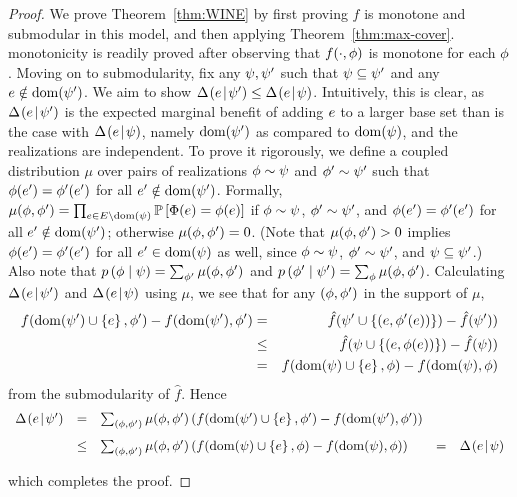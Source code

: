 \begin{proof}
We prove Theorem~\ref{thm:WINE} by first proving $f$ is \term monotone
and \term submodular in
this model, and then applying Theorem~\ref{thm:max-cover}.
\Term monotonicity is readily proved after observing that 
$f(\cdot, \rlz)$ is monotone for each $\rlz$. 
Moving on to \term submodularity, fix any $\prlz, \prlz'$ such that 
$\prlz \subseteq \prlz'$ and any $\elem \notin \dom(\prlz')$.
We aim to show $\diff{\prlz'}{\elem} \le \diff{\prlz}{\elem}$.
Intuitively, this is clear, as $\diff{\prlz'}{\elem}$ is the expected marginal
benefit of adding $\elem$ to a larger base set than
is the case with $\diff{\prlz}{\elem}$, namely  $\dom(\prlz')$ as
compared to $\dom(\prlz)$, and the realizations are independent.
To prove it rigorously, 
we define a coupled distribution $\mu$ over pairs of realizations $\rlz \sim
\prlz$ and $\rlz' \sim \prlz'$ such that 
$\rlz(e') = \rlz'(e')$ for all $e' \notin \dom(\prlz')$.
Formally, 
$\mu(\rlz, \rlz') = \prod_{e \in \groundset \setminus
  \dom(\prlz)}\Pr{\rvrlz(e) = \rlz(e)}$
%
if  $\rlz \sim \prlz$, $\rlz' \sim \prlz'$, and $\rlz(e') =
\rlz'(e')$ for all $e' \notin \dom(\prlz')$; 
otherwise $\mu(\rlz, \rlz') = 0$.  
(Note that $\mu(\rlz, \rlz') > 0$ implies $\rlz(e') = \rlz'(e')$ for all $e' \in \dom(\prlz)$ as well,
since $\rlz \sim \prlz$, $\rlz' \sim \prlz'$, and  $\prlz \subseteq \prlz'$.)
Also note that $\rlzmass{\rlz \mid \prlz} = \sum_{\rlz'} \mu(\rlz, \rlz')$ and $\rlzmass{\rlz' \mid \prlz'} = \sum_{\rlz} \mu(\rlz, \rlz')$. 
Calculating 
$\diff{\prlz'}{\elem}$ and $\diff{\prlz}{\elem}$ using $\mu$, we see 
that for any $(\rlz, \rlz')$ in the support of $\mu$, 
\begin{eqnarray*}
  \label{eq:1mc}
f(\dom(\prlz') \cup \set{e}, \rlz') - f(\dom(\prlz'),
  \rlz')  & = & \hat{f}(\prlz' \cup \set{(\elem,\rlz'(\elem))}) -
  \hat{f}(\prlz'))\\
 & \le & \hat{f}(\prlz \cup \set{(\elem,\rlz(\elem))}) -
  \hat{f}(\prlz)) \\
 & = & f(\dom(\prlz) \cup \set{e}, \rlz) - f(\dom(\prlz),
  \rlz)
\end{eqnarray*}
from the submodularity of $\hat{f}$.
Hence 
\[
\begin{array}{lllll}
  \label{eq:2mc}
\diff{\prlz'}{\elem} & = & \sum_{(\rlz, \rlz')} \mu(\rlz, \rlz') \paren{
f(\dom(\prlz') \cup \set{\elem}, \rlz') - f(\dom(\prlz'),
  \rlz')} &  & \\[3mm]
  & \le & \sum_{(\rlz, \rlz')} \mu(\rlz, \rlz') \paren{ f(\dom(\prlz) \cup \set{\elem}, \rlz) - f(\dom(\prlz),
  \rlz)} & = & \diff{\prlz}{\elem}
\end{array}
\]
which completes the proof. 
\end{proof}






%
%
%
%
%

